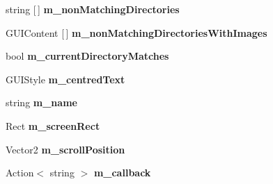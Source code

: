 \begin{DoxyCompactItemize}
string \mbox{[}$\,$\mbox{]} {\bfseries m\+\_\+non\+Matching\+Directories}
\item 
\mbox{\label{class_lerp2_a_p_i_1_1_utility_1_1_file_browser_a3a6135dd852623a0dd311c6c5f3378e9}} 
G\+U\+I\+Content \mbox{[}$\,$\mbox{]} {\bfseries m\+\_\+non\+Matching\+Directories\+With\+Images}
\item 
\mbox{\label{class_lerp2_a_p_i_1_1_utility_1_1_file_browser_a3b1b72f10b7fdf6b3fe8c3c1fdd60b24}} 
bool {\bfseries m\+\_\+current\+Directory\+Matches}
\item 
\mbox{\label{class_lerp2_a_p_i_1_1_utility_1_1_file_browser_af6a10e7a0c942f95ccfa714e516f1cf6}} 
G\+U\+I\+Style {\bfseries m\+\_\+centred\+Text}
\item 
\mbox{\label{class_lerp2_a_p_i_1_1_utility_1_1_file_browser_afa53a570f3d3e18b078af3a6e12a3085}} 
string {\bfseries m\+\_\+name}
\item 
\mbox{\label{class_lerp2_a_p_i_1_1_utility_1_1_file_browser_a848e2a24a604ded6b810c0274f4abf49}} 
Rect {\bfseries m\+\_\+screen\+Rect}
\item 
\mbox{\label{class_lerp2_a_p_i_1_1_utility_1_1_file_browser_a3b8a38f675fd8e67d6197135b3d609b6}} 
Vector2 {\bfseries m\+\_\+scroll\+Position}
\item 
\mbox{\label{class_lerp2_a_p_i_1_1_utility_1_1_file_browser_ab12fa26935e814901609c1cab44c6f84}} 
Action$<$ string $>$ {\bfseries m\+\_\+callback}
\end{DoxyCompactItemize}
